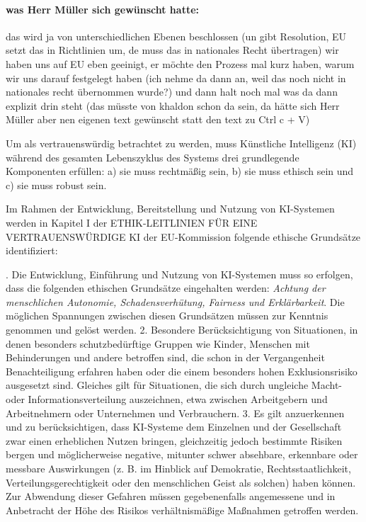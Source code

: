 \documentclass[12pt]{article}
\begin{document}
\paragraph{was Herr Müller sich gewünscht hatte:}
das wird ja von unterschiedlichen Ebenen beschlossen (un gibt Resolution, EU setzt das in Richtlinien um, de muss das in nationales Recht übertragen) wir haben uns auf EU eben geeinigt, er möchte den Prozess mal kurz haben, warum wir uns darauf festgelegt haben (ich nehme da dann an, weil das noch nicht in nationales recht übernommen wurde?) und dann halt noch mal was da dann explizit drin steht (das müsste von khaldon schon da sein, da hätte sich Herr Müller aber nen eigenen text gewünscht statt den text zu Ctrl c + V)


Um als vertrauenswürdig betrachtet zu werden, muss Künstliche Intelligenz (KI) während des gesamten Lebenszyklus des Systems drei grundlegende Komponenten erfüllen: a) sie muss rechtmäßig sein, b) sie muss ethisch sein und c) sie muss robust sein.

Im Rahmen der Entwicklung, Bereitstellung und Nutzung von KI-Systemen werden in Kapitel I der \glqq ETHIK-LEITLINIEN FÜR EINE VERTRAUENSWÜRDIGE KI\grqq{} der EU-Kommission folgende ethische Grundsätze identifiziert:

. Die Entwicklung, Einführung und Nutzung von KI-Systemen muss so erfolgen, dass die folgenden ethischen Grundsätze eingehalten werden: \textit{Achtung der menschlichen Autonomie, Schadensverhütung, Fairness und Erklärbarkeit}. Die möglichen Spannungen zwischen diesen Grundsätzen müssen zur Kenntnis genommen und gelöst werden. 
2. Besondere Berücksichtigung von Situationen, in denen besonders schutzbedürftige Gruppen wie Kinder, Menschen mit Behinderungen und andere betroffen sind, die schon in der Vergangenheit Benachteiligung erfahren haben oder die einem besonders hohen Exklusionsrisiko ausgesetzt sind. Gleiches gilt für Situationen, die sich durch ungleiche Macht- oder Informationsverteilung auszeichnen, etwa zwischen Arbeitgebern und Arbeitnehmern oder Unternehmen und Verbrauchern.
3. Es gilt anzuerkennen und zu berücksichtigen, dass KI-Systeme dem Einzelnen und der Gesellschaft zwar einen erheblichen Nutzen bringen, gleichzeitig jedoch bestimmte Risiken bergen und möglicherweise negative, mitunter schwer absehbare, erkennbare oder messbare Auswirkungen (z. B. im Hinblick auf Demokratie, Rechtsstaatlichkeit, Verteilungsgerechtigkeit oder den menschlichen Geist als solchen) haben können. Zur Abwendung dieser Gefahren müssen gegebenenfalls angemessene und in Anbetracht der Höhe des Risikos verhältnismäßige Maßnahmen getroffen werden.\grqq{}
\end{document}

